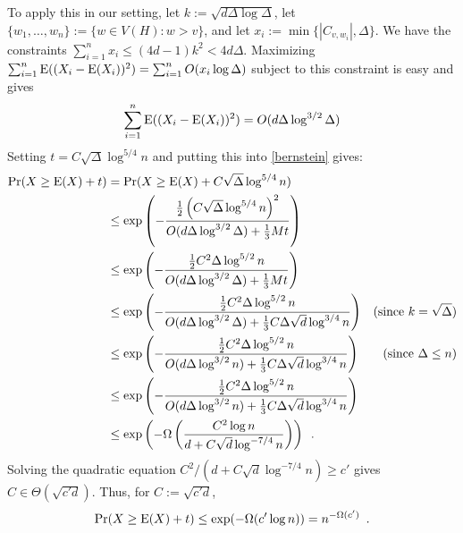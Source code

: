 \documentclass{patmorin}
\begin{document}
To apply this in our setting, let $k:=\sqrt{d\Delta\log\Delta}$, let $\{w_1,\ldots,w_n\}:=\{w\in V(H):w>v\}$, and let $x_i:=\min\{|C_{v,w_i}|,\Delta\}$.  We have the constraints $\sum_{i=1}^n x_i \le (4d-1)k^2 < 4d\Delta$.  Maximizing $\sum_{i=1}^n\mathrm{E}((X_i-\mathrm{E}(X_i))^2)=\sum_{i=1}^n O(x_i\log \Delta)$ subject to this constraint is easy and gives
\[
  \sum_{i=1}^n\mathrm{E}((X_i-\mathrm{E}(X_i))^2) = O(d\Delta\log^{3/2} \Delta)
\]
Setting $t=C\sqrt{\Delta}\log^{5/4} n$ and putting this into \cref{bernstein} gives:
\begin{align*}
  \Pr(X\ge \mathrm{E}(X)+t)
  & = \Pr(X\ge \mathrm{E}(X)+C\sqrt{\Delta}\log^{5/4} n) \\
  & \le \exp \left(-\frac{\tfrac{1}{2}\left(C\sqrt{\Delta}\log^{5/4} n\right)^2}{O(d\Delta\log^{3/2}\Delta) + \tfrac{1}{3}Mt}\right) \\
  & \le \exp \left(-\frac{\tfrac{1}{2}C^2\Delta\log^{5/2} n}{O(d\Delta\log^{3/2}\Delta) + \tfrac{1}{3}Mt}\right) \\
  & \le \exp \left(-\frac{\tfrac{1}{2}C^2\Delta\log^{5/2} n}{O(d\Delta\log^{3/2}\Delta) + \tfrac{1}{3}C\Delta\sqrt{d}\log^{3/4} n}\right) & \text{(since $k=\sqrt{\Delta}$)} \\
  & \le \exp \left(-\frac{\tfrac{1}{2}C^2\Delta\log^{5/2} n}{O(d\Delta\log^{3/2} n) + \tfrac{1}{3}C\Delta\sqrt{d}\log^{3/4} n}\right)
  & \text{(since $\Delta \le n$)} \\
  & \le \exp \left(-\frac{\tfrac{1}{2}C^2\Delta\log^{5/2} n}{O(d\Delta\log^{3/2} n) + \tfrac{1}{3}C\Delta\sqrt{d}\log^{3/4} n}\right) \\
  & \le \exp \left(-\Omega\left(\frac{C^2\log n}{d + C\sqrt{d}\log^{-7/4} n}\right)\right) \enspace .
\end{align*}
Solving the quadratic equation $C^2/(d+C\sqrt{d}\log^{-7/4} n) \ge c'$ gives $C\in\Theta(\sqrt{c'd})$. Thus, for $C:=\sqrt{c'd}$,
\[
  \Pr(X\ge \mathrm{E}(X)+t) \le \exp(-\Omega(c'\log n)) = n^{-\Omega(c')} \enspace .
\]
\end{document}
